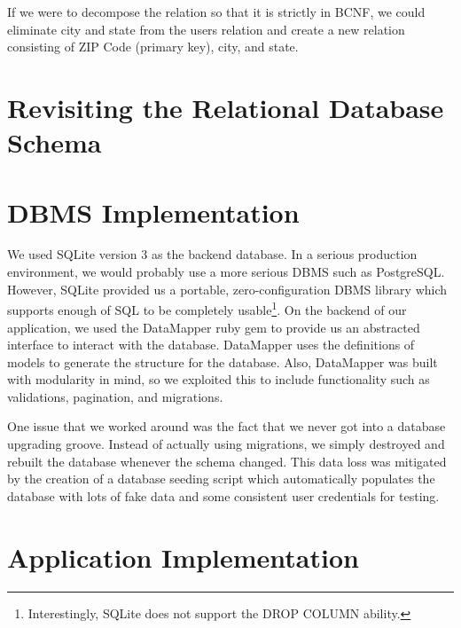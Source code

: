 \documentclass{acm_proc_article-sp}
\begin{document}
If we were to decompose the relation so that it is strictly in BCNF, we could eliminate city and state from the users
relation and create a new relation consisting of ZIP Code (primary key), city, and state.
\section{Revisiting the Relational Database Schema}
\section{DBMS Implementation}
We used SQLite version 3 as the backend database. In a serious production environment, we would probably use
a more serious DBMS such as PostgreSQL. However, SQLite provided us a portable, zero-configuration DBMS library
which supports enough of SQL to be completely usable\footnote{Interestingly, SQLite does not support the DROP COLUMN ability.}.
On the backend of our application, we used the DataMapper ruby gem to provide us an abstracted interface to
interact with the database. DataMapper uses the definitions of models to generate the structure for the database.
Also, DataMapper was built with modularity in mind, so we exploited this to include functionality such as validations,
pagination, and migrations.

One issue that we worked around was the fact that we never got into a database upgrading groove. Instead of actually
using migrations, we simply destroyed and rebuilt the database whenever the schema changed. This data loss was mitigated
by the creation of a database seeding script which automatically populates the database with lots of fake data and some
consistent user credentials for testing.

\section{Application Implementation}
\end{document}
